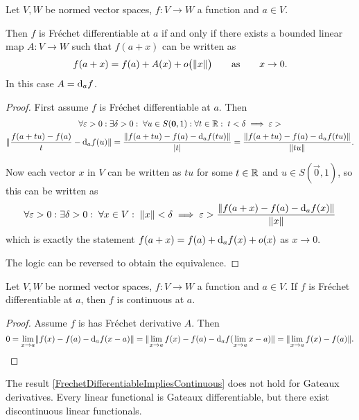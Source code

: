 \begin{proposition} \label{FrechetDerivativeAsymptotics}
Let $V,W$ be normed vector spaces, $f:V\to W$ a function and $a\in V$.

Then $f$ is Fréchet differentiable at $a$ \textup{if and only if} there exists a bounded linear map $A: V\to W$ such that $f(a+x)$ can be written as
\[ f(a+x) = f(a) + A(x) + o\big(\lVert x\rVert\big) \qquad \text{as} \qquad x\to 0. \]
In this case $A = \operatorname{d \!}{_af}$.
\end{proposition}
\begin{proof}
First assume $f$ is Fréchet differentiable at $a$. Then
\begin{multline*}
\forall \varepsilon>0:\exists \delta>0: \; \forall u\in S(\boldsymbol{\mathrm{0}},1): \forall t\in\mathbb{R}: \; t< \delta \implies \varepsilon > \\ \lVert\frac{f(a+tu) - f(a)}{t} - \operatorname{d \!}{_af}(u)\rVert = \frac{\lVert f(a+tu) - f(a)- \operatorname{d \!}{_af}(tu)\rVert}{|t|} = \frac{\lVert f(a+tu) - f(a)- \operatorname{d \!}{_af}(tu)\rVert}{\lVert tu\rVert}.
\end{multline*}

Now each vector $x$ in $V$ can be written as $tu$ for some $t\in\mathbb{R}$ and $u\in S(\vec{0},1)$, so this can be written as
\[ \forall \varepsilon>0:\exists \delta>0: \; \forall x\in V: \; \lVert x\rVert< \delta \implies  \varepsilon > \frac{\lVert f(a+x) - f(a)- \operatorname{d \!}{_af}(x)\rVert}{\lVert x\rVert} \]
which is exactly the statement $f(a+x) = f(a) + \operatorname{d \!}{_af}(x) + o(x)$ as $x\to 0$.

The logic can be reversed to obtain the equivalence.
\end{proof}

\begin{proposition} \label{FrechetDifferentiableImpliesContinuous}
Let $V,W$ be normed vector spaces, $f:V\to W$ a function and $a\in V$. If $f$ is Fréchet differentiable at $a$, then $f$ is continuous at $a$.
\end{proposition}
\begin{proof}
Assume $f$ is has Fréchet derivative $A$. Then
\[ 0 = \lim_{x\to a} \lVert f(x) - f(a) - \operatorname{d \!}{_af}(x-a)\rVert = \lVert\lim_{x\to a}f(x) - f(a) - \operatorname{d \!}{_af}(\lim_{x\to a} x-a)\rVert = \lVert\lim_{x\to a}f(x) - f(a)\rVert. \]
\end{proof}

\begin{example}
The result \ref{FrechetDifferentiableImpliesContinuous} does not hold for Gateaux derivatives. Every linear functional is Gateaux differentiable, but there exist discontinuous linear functionals.
\end{example}

